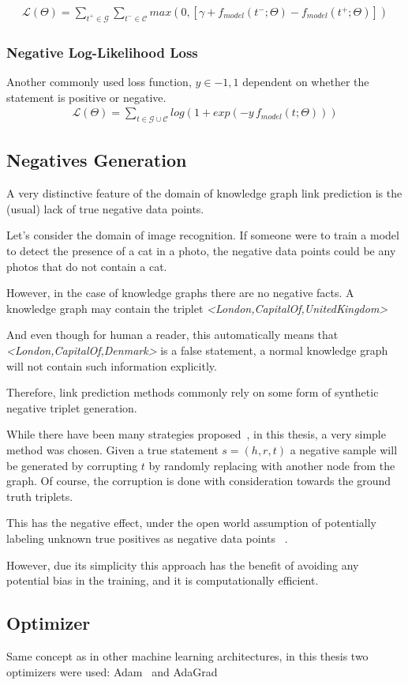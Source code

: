 \begin{gather*}
    \mathcal{L}(\Theta) = \sum_{t^+ \in \mathcal{G}}\sum_{t^- \in \mathcal{C}}max(0, [\gamma + f_{model}(t^-;\Theta)
 - f_{model}(t^+;\Theta)])
\end{gather*}

\subsubsection{Negative Log-Likelihood Loss}
Another commonly used loss function, $y \in -1,1 $ dependent on whether the statement is positive or negative.
\begin{gather*}
    \mathcal{L}(\Theta) = \sum_{t \in \mathcal{G} \cup \mathcal{C}}log(1 + exp(-y \, f_{model}(t;\Theta)))
\end{gather*}

\subsection{Negatives Generation}
A very distinctive feature of the domain of knowledge graph link prediction is the (usual) lack of true negative data points.

Let's consider the domain of image recognition.
If someone were to train a model to detect the presence of a cat in a photo,
the negative data points could be any photos that do not contain a cat.

However, in the case of knowledge graphs there are no negative facts.
A knowledge graph may contain the triplet \textit{<London,CapitalOf,UnitedKingdom>}

And even though for human a reader, this automatically means that \textit{<London,CapitalOf,Denmark>} is a false statement,
a normal knowledge graph will not contain such information explicitly.

Therefore, link prediction methods commonly rely on some form of synthetic negative triplet generation.

While there have been many strategies proposed~\cite{NegSamp}, in this thesis, a very simple method was chosen.
Given a true statement $s = (h,r,t)$ a negative sample will be generated by corrupting $t$ by randomly replacing with another node from the graph.
Of course, the corruption is done with consideration towards the ground truth triplets.

This has the negative effect, under the open world assumption
of potentially labeling unknown true positives as negative data points ~\cite{OpenWorld}.

However, due its simplicity this approach has the benefit of avoiding any potential bias in the training,
and it is computationally efficient.

\subsection{Optimizer}
Same concept as in other machine learning architectures, in this thesis two optimizers were used:
Adam~\cite{Adam} and AdaGrad~\cite{Adagrad}

